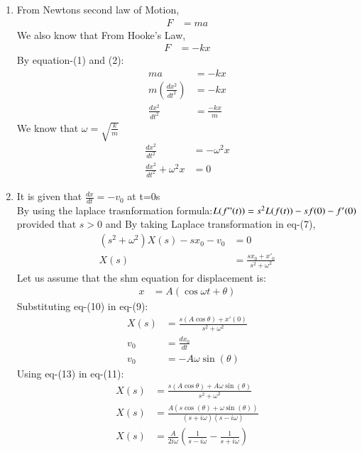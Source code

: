 \documentclass[journal,12pt,twocolumn]{IEEEtran}
\theoremstyle{remark}
\begin{document}
\begin{enumerate}
\\
\item{}
From Newtons second law of Motion,
\begin{align}
    F&=ma 
\end{align}
We also know that From Hooke's Law, 
\begin{align}
F&=-kx
\end{align}
By equation-(1) and (2):
\begin{align}
    ma&=-kx\\
    m(\frac{dx^2}{dt^2})&=-kx\\
    \frac{dx^2}{dt^2}&=\frac{-kx}{m}
\end{align}
We know that $\omega=\sqrt{\frac{k}{m}}$
\begin{align}
    \frac{dx^2}{dt^2}&=-\omega^2x\\
    \frac{dx^2}{dt^2}+\omega^2x&=0
    \end{align}
\item{}
It is given that $\frac{dx}{dt}=-v_0$ at t=0s\\
By using the laplace trasnformation formula:$L(f"(t))=s^2L(f(t))-sf(0)-f'(0)$ provided that $s>0$ and  
By taking Laplace transformation in eq-(7),
\begin{align}    
(s^2 + \omega^2)X(s) - sx_0 - v_0&=0\\
X(s) &= \frac{sx_0 + x'_0}{s^2 + \omega^2}
\end{align}
Let us assume that the shm equation for displacement is:
\begin{align}
    x&=A(\cos{\omega t}+\theta)
\end{align}
Substituting eq-(10) in eq-(9):
\begin{align}
    X(s)&=\frac{s(A{\cos{\theta}})+x'(0)}{s^2 + \omega^2}\\
    v_0&=\frac{dx_0}{dt}\\
    v_0&=-A\omega{}\sin(\theta{})
\end{align}
Using eq-(13) in eq-(11):
\begin{align}
     X(s)&=\frac{s(A{\cos{\theta}})+A\omega{}\sin(\theta{})}{s^2 + \omega^2}\\
     X(s)&= \frac{A(s\cos(\theta) + \omega \sin(\theta))}{(s + i\omega)(s - i\omega)} \\
     X(s)&= \frac{A}{2i\omega} \left(\frac{1}{s - i\omega} - \frac{1}{s + i\omega}\right)

\end{align}
\end{enumerate}
\end{document}
